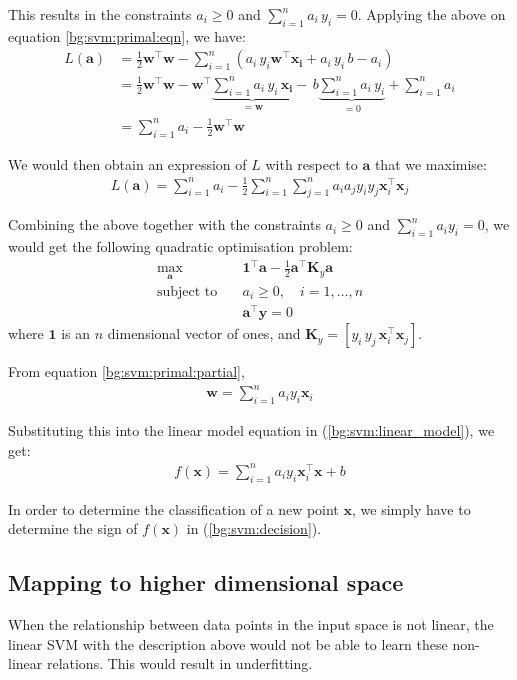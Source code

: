 \documentclass[12pt, twoside, a4paper]{report}
\def\vec{\boldsymbol}
\begin{document}
This results in the constraints $a_i \geq 0$ and $\sum_{i=1}^n a_i \, y_i = 0$. Applying the above on equation \ref{bg:svm:primal:eqn}, we have:
\begin{align*}
L(\vec{a}) &= \frac{1}{2} \vec{w}^\top \vec{w} - \sum_{i=1}^n \left( a_i \, y_i \vec{w}^\top \vec{x_i} + a_i\,y_i \, b - a_i \right) \\
&= \frac{1}{2} \vec{w}^\top \vec{w} - \vec{w}^\top \underbrace{\sum_{i=1}^n  a_i \, y_i \, \vec{x_i}}_{=\vec{w}} - \, b \underbrace{ \sum_{i=1}^n a_i\,y_i}_{=0} + \sum_{i=1}^n a_i \\
&= \sum_{i=1}^n a_i - \frac{1}{2} \vec{w}^\top \vec{w}
\end{align*}

We would then obtain an expression of $L$ with respect to $\vec a$ that we maximise:
\begin{align*}
L(\vec a) = \sum_{i=1}^n a_i - \frac{1}{2} \sum_{i=1}^n \sum_{j=1}^n a_i a_j y_i y_j \vec{x}_i^\top \vec{x}_j
\end{align*}

Combining the above together with the constraints $a_i \geq 0$ and $\sum_{i=1}^n a_i y_i = 0$, we would get the following quadratic optimisation problem:
\begin{align*}
\max_{\vec a} \quad &\vec{1}^\top \vec a - \frac{1}{2} \vec{a}^\top \vec{K}_y \vec{a} \\
\text{subject to} \quad &a_i \geq 0, \quad i = 1, \dots , n \\
&\vec{a}^\top \vec y = 0
\end{align*}
where $\vec{1}$ is an $n$ dimensional vector of ones, and $\vec{K}_y = \left[ y_i \, y_j \, \vec{x}_i^\top \vec{x}_j \right]$.

From equation \ref{bg:svm:primal:partial},
\begin{align*}
\vec{w} = \sum_{i=1}^n a_i y_i \vec{x}_i
\end{align*}

Substituting this into the linear model equation in (\ref{bg:svm:linear_model}), we get:
\begin{align}
f(\vec{x}) = \sum_{i=1}^n a_i y_i \vec{x}_i^\top \vec{x} + b \label{bg:svm:decision}
\end{align}

In order to determine the classification of a new  point $\vec{x}$, we simply have to determine the sign of $f(\vec{x})$ in (\ref{bg:svm:decision}).

\subsection{Mapping to higher dimensional space}
When the relationship between data points in the input space is not linear, the linear SVM with the description above would not be able to learn these non-linear relations. This would result in underfitting.
\end{document}
